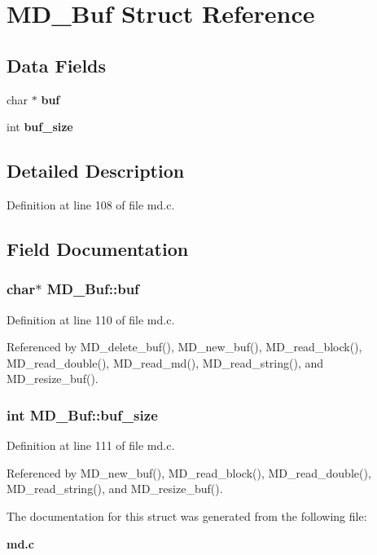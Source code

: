 \section{MD\_\-Buf Struct Reference}
\label{structMD__Buf}
\subsection*{Data Fields}
\begin{CompactItemize}
\item 
char $\ast$ \bf{buf}
\item 
int \bf{buf\_\-size}
\end{CompactItemize}


\subsection{Detailed Description}




Definition at line 108 of file md.c.

\subsection{Field Documentation}
\subsubsection{\setlength{\rightskip}{0pt plus 5cm}char$\ast$ \bf{MD\_\-Buf::buf}}\label{structMD__Buf_570c710defc5bcea3a51b0226687b188}




Definition at line 110 of file md.c.

Referenced by MD\_\-delete\_\-buf(), MD\_\-new\_\-buf(), MD\_\-read\_\-block(), MD\_\-read\_\-double(), MD\_\-read\_\-md(), MD\_\-read\_\-string(), and MD\_\-resize\_\-buf().
\subsubsection{\setlength{\rightskip}{0pt plus 5cm}int \bf{MD\_\-Buf::buf\_\-size}}\label{structMD__Buf_75766f1c7736e2bb6906f563d40e118d}




Definition at line 111 of file md.c.

Referenced by MD\_\-new\_\-buf(), MD\_\-read\_\-block(), MD\_\-read\_\-double(), MD\_\-read\_\-string(), and MD\_\-resize\_\-buf().

The documentation for this struct was generated from the following file:\begin{CompactItemize}
\item 
\bf{md.c}\end{CompactItemize}
